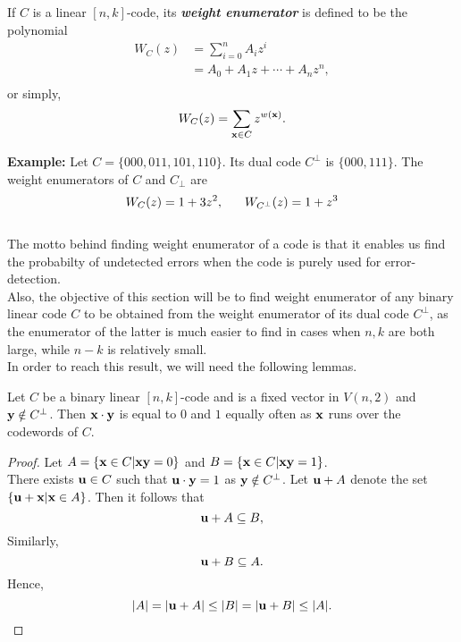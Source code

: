 \documentclass[../main.tex]{subfiles}
\begin{document}
\begin{defn}
	If $C$ is a linear $[n,k]$-code, its \textbf{\emph{weight enumerator}} is defined to be the polynomial
	\begin{align*}
		W_C(z) &= \sum_{i=0}^n A_iz^i \\
		&= A_0 + A_1z + \cdots + A_nz^n, \\
	\end{align*}
	or simply,
	\[
		W_C(z) = \sum_{\textbf{x} \in C} z^{w(\textbf{x})}.
	\]
\end{defn}

\textbf{Example:} Let $C = \{ 000,011,101,110 \}$. Its dual code $C^\perp$ is $\{ 000,111 \}$. The weight enumerators of $C$ and $C_\perp$ are
\[
	W_C(z) = 1 + 3z^2, 
	\hspace{6mm}
	W_{C^\perp}(z) = 1 + z^3 \\
\]\\
The motto behind finding weight enumerator of a code is that it enables us find the probabilty of undetected errors when the code is purely used for error-detection.\\
Also, the objective of this section will be to find weight enumerator of any binary linear code $C$ to be obtained from the weight enumerator of its dual code $C^\perp$, as the enumerator of the latter is much easier to find in cases when $n, k$ are both large, while $n-k$ is relatively small.\\
In order to reach this result, we will need the following lemmas.

\begin{lem}\label{lem_eqof_01}
	Let $C$ be a binary linear $[n,k]$-code and  is a fixed vector in $V(n,2)$ and $\textbf{y} \notin C^\perp$. Then $\textbf{x}\cdot \textbf{y}$ is equal to $0$ and $1$ equally often as $\textbf{x}$ runs over the codewords of $C$.
\end{lem}
\begin{proof}
	Let $A = \{ \textbf{x} \in C | \textbf{x}\textbf{y} = 0 \}$ and $B = \{ \textbf{x} \in C | \textbf{x}\textbf{y} = 1 \}$.\\
	There exists $\textbf{u} \in C$ such that $\textbf{u}\cdot \textbf{y} = 1$ as $\textbf{y} \notin C^\perp$. Let $\textbf{u} + A$ denote the set $\{ \textbf{u} + \textbf{x} | \textbf{x}\in A \}$. Then it follows that
	\[
		\textbf{u} + A \subseteq B,
	\]
	Similarly, 
	\[
		\textbf{u} + B \subseteq A.
	\]
	Hence,
	\[
		|A| = |\textbf{u} + A| \leq |B| = |\textbf{u} + B| \leq |A|. 
	\]
\end{proof}
\end{document}
